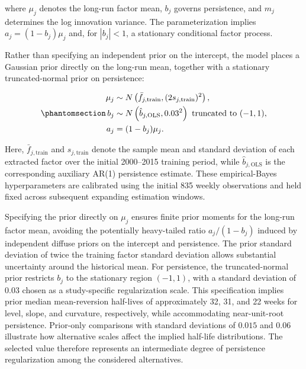 \documentclass[
  12pt,
  letterpaper,
  DIV=11,
  numbers=noendperiod]{scrreprt}
\begin{document}
where \(\mu_j\) denotes the long-run factor mean, \(b_j\) governs
persistence, and \(m_j\) determines the log innovation variance. The
parameterization implies \(a_j=(1-b_j)\mu_j\) and, for \(|b_j|<1\), a
stationary conditional factor process.

Rather than specifying an independent prior on the intercept, the model
places a Gaussian prior directly on the long-run mean, together with a
stationary truncated-normal prior on persistence:

\begin{equation}\protect\phantomsection\label{eq-coefficient-prior}{
\begin{aligned}
\mu_j&\sim N \left(
\bar f_{j,\mathrm{train}},
(2s_{j,\mathrm{train}})^2
\right),\\
b_j&\sim N \left(
\hat b_{j,\mathrm{OLS}},0.03^2
\right)\text{ truncated to }(-1,1),\\
a_j&=(1-b_j)\mu_j.
\end{aligned}
}\end{equation}

Here, \(\bar f_{j,\mathrm{train}}\) and \(s_{j,\mathrm{train}}\) denote
the sample mean and standard deviation of each extracted factor over the
initial 2000--2015 training period, while \(\hat b_{j,\mathrm{OLS}}\) is
the corresponding auxiliary AR(1) persistence estimate. These
empirical-Bayes hyperparameters are calibrated using the initial 835
weekly observations and held fixed across subsequent expanding
estimation windows.

Specifying the prior directly on \(\mu_j\) ensures finite prior moments
for the long-run factor mean, avoiding the potentially heavy-tailed
ratio \(a_j/(1-b_j)\) induced by independent diffuse priors on the
intercept and persistence. The prior standard deviation of twice the
training factor standard deviation allows substantial uncertainty around
the historical mean. For persistence, the truncated-normal prior
restricts \(b_j\) to the stationary region \((-1,1)\), with a standard
deviation of \(0.03\) chosen as a study-specific regularization scale.
This specification implies prior median mean-reversion half-lives of
approximately 32, 31, and 22 weeks for level, slope, and curvature,
respectively, while accommodating near-unit-root persistence. Prior-only
comparisons with standard deviations of \(0.015\) and \(0.06\)
illustrate how alternative scales affect the implied half-life
distributions. The selected value therefore represents an intermediate
degree of persistence regularization among the considered alternatives.
\end{document}
